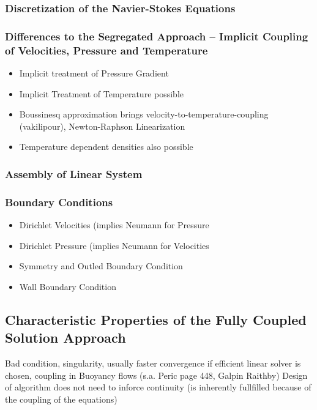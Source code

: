 \documentclass[article,type=msc,colorback,accentcolor=tud2a]{tudthesis}
\begin{document}
      \subsubsection{Discretization of the Navier-Stokes Equations}
      \subsubsection{Differences to the Segregated Approach -- Implicit Coupling of Velocities, Pressure and Temperature}

          \begin{itemize}
            \item Implicit treatment of Pressure Gradient
            \item Implicit Treatment of Temperature possible
            \item Boussinesq approximation brings velocity-to-temperature-coupling (vakilipour), Newton-Raphson Linearization
            \item Temperature dependent densities also possible
          \end{itemize}

      \subsubsection{Assembly of Linear System}

      \subsubsection{Boundary Conditions}

      \begin{itemize}
        \item Dirichlet Velocities (implies Neumann for Pressure
        \item Dirichlet Pressure (implies Neumann for Velocities
        \item Symmetry and Outled Boundary Condition
        \item Wall Boundary Condition
      \end{itemize}

    \subsection{Characteristic Properties of the Fully Coupled Solution Approach}

        Bad condition, singularity, usually faster convergence if efficient linear solver is chosen, coupling in Buoyancy flows (s.a. Peric page 448, Galpin Raithby)
        Design of algorithm does not need to inforce continuity (is inherently fullfilled because of the coupling of the equations)
\end{document}
